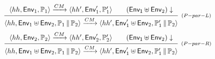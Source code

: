 \documentclass[a4paper,UKenglish]{article}%
\theoremstyle{plain}
\begin{document}
\[
\infer[{\scriptstyle (P-par-L)}]
{\langle \hh, \mathsf{Env}_1 \uplus \mathsf{Env}_2, \prog_1 \Par \prog_2 \rangle 
\xrightarrow{CM} \langle \hh', \mathsf{Env}_1' \uplus \mathsf{Env}_2, 
\prog_1' \Par \prog_2 \rangle }
{ \begin{array}{c}
\langle \hh, \mathsf{Env}_1, \prog_1 \rangle \xrightarrow{CM} \langle \hh', \mathsf{Env}_1', \prog_1' \rangle
\qquad (\mathsf{Env_1} \uplus \mathsf{Env}_2)\downarrow
\end{array}
}
\]
\[
\infer[{\scriptstyle (P-par-R)}]
{\langle \hh, \mathsf{Env}_1 \uplus \mathsf{Env}_2, \prog_1 \Par \prog_2 \rangle 
\xrightarrow{CM} \langle \hh', \mathsf{Env}_1' \uplus \mathsf{Env}_2, 
\prog_1' \Par \prog_2 \rangle }
{ \begin{array}{c}
\langle \hh, \mathsf{Env}_2, \prog_2 \rangle \xrightarrow{CM} \langle \hh', \mathsf{Env}_2', \prog_2' \rangle
\qquad (\mathsf{Env_1} \uplus \mathsf{Env}_2)\downarrow
\end{array}
}
\]
\end{document}
